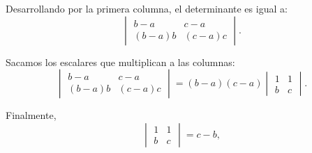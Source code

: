 \documentclass[a4paper,12pt]{article}
\begin{document}
\begin{ejercicio}[title=Ejercicio 34]
Desarrollando por la primera columna, el determinante es igual a:
\[
\begin{vmatrix}
b-a & c-a\\
(b-a)b & (c-a)c
\end{vmatrix}.
\]

Sacamos los escalares que multiplican a las columnas:
\[
\begin{vmatrix}
b-a & c-a\\
(b-a)b & (c-a)c
\end{vmatrix}
=
(b-a)(c-a)
\begin{vmatrix}
1 & 1\\
b & c
\end{vmatrix}.
\]

Finalmente,
\[
\begin{vmatrix}
1 & 1\\
b & c
\end{vmatrix}
= c-b,
\]
\end{ejercicio}
\end{document}
